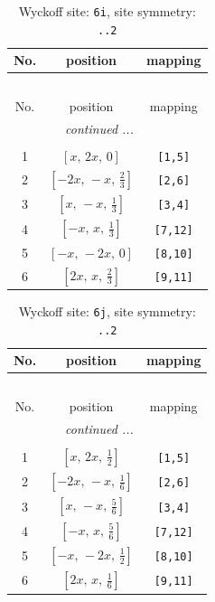 \documentclass[fleqn,8pt]{jsarticle}
\begin{document}
\renewcommand{\arraystretch}{1.2}
\begin{longtable}{ccc}
\caption{Wyckoff site: {\tt 6i}, site symmetry: {\tt ..2}}
 \\
 \hline \hline
No. & position & mapping \\ \hline \endfirsthead

\multicolumn{2}{l}{\tablename\ \thetable{}} \\
 \hline \hline
No. & position & mapping \\ \hline \endhead

 \hline \hline
\multicolumn{2}{r}{\footnotesize\it continued ...} \\ \endfoot

 \hline \hline
\multicolumn{2}{r}{} \\ \endlastfoot

1 & $\left[ x,\, 2 x,\, 0 \right]$ & {\tt [1,5]} \\ \hline
2 & $\left[ - 2 x,\, - x,\, \frac{2}{3} \right]$ & {\tt [2,6]} \\ \hline
3 & $\left[ x,\, - x,\, \frac{1}{3} \right]$ & {\tt [3,4]} \\ \hline
4 & $\left[ - x,\, x,\, \frac{1}{3} \right]$ & {\tt [7,12]} \\ \hline
5 & $\left[ - x,\, - 2 x,\, 0 \right]$ & {\tt [8,10]} \\ \hline
6 & $\left[ 2 x,\, x,\, \frac{2}{3} \right]$ & {\tt [9,11]} \\
\end{longtable}
\renewcommand{\arraystretch}{1.2}
\begin{longtable}{ccc}
\caption{Wyckoff site: {\tt 6j}, site symmetry: {\tt ..2}}
 \\
 \hline \hline
No. & position & mapping \\ \hline \endfirsthead

\multicolumn{2}{l}{\tablename\ \thetable{}} \\
 \hline \hline
No. & position & mapping \\ \hline \endhead

 \hline \hline
\multicolumn{2}{r}{\footnotesize\it continued ...} \\ \endfoot

 \hline \hline
\multicolumn{2}{r}{} \\ \endlastfoot

1 & $\left[ x,\, 2 x,\, \frac{1}{2} \right]$ & {\tt [1,5]} \\ \hline
2 & $\left[ - 2 x,\, - x,\, \frac{1}{6} \right]$ & {\tt [2,6]} \\ \hline
3 & $\left[ x,\, - x,\, \frac{5}{6} \right]$ & {\tt [3,4]} \\ \hline
4 & $\left[ - x,\, x,\, \frac{5}{6} \right]$ & {\tt [7,12]} \\ \hline
5 & $\left[ - x,\, - 2 x,\, \frac{1}{2} \right]$ & {\tt [8,10]} \\ \hline
6 & $\left[ 2 x,\, x,\, \frac{1}{6} \right]$ & {\tt [9,11]} \\
\end{longtable}
\end{document}
